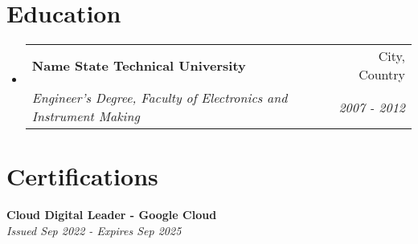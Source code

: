 \documentclass[letterpaper,11pt]{article}
\makeatletter
\newcommand{\resumeItem}[1]{
  \item\small{
    {#1 \vspace{-2pt}}
  }
}
\newcommand{\resumeSubheading}[4]{
  \vspace{-2pt}\item
    \begin{tabular*}{0.97\textwidth}[t]{l@{\extracolsep{\fill}}r}
      \textbf{#1} & #2 \\
      \textit{\small#3} & \textit{\small #4} \\
    \end{tabular*}\vspace{-7pt}
}
\newcommand{\resumeProjectHeading}[2]{
    \item
    \begin{tabular*}{0.97\textwidth}{l@{\extracolsep{\fill}}r}
      \small#1 & #2 \\
    \end{tabular*}\vspace{-7pt}
}
\newcommand{\resumeSubHeadingListStart}{\begin{itemize}[leftmargin=0.15in, label={}]}
\newcommand{\resumeSubHeadingListEnd}{\end{itemize}}
\newcommand{\resumeItemListStart}{\begin{itemize}}
\newcommand{\resumeItemListEnd}{\end{itemize}\vspace{-5pt}}
\makeatother
\begin{document}

\section{Education}
  \resumeSubHeadingListStart
    \resumeSubheading
      {Name State Technical University}{City, Country}
      {Engineer's Degree, Faculty of Electronics and Instrument Making}{2007 - 2012}
  \resumeSubHeadingListEnd

\section{Certifications}
  \begin{itemize}[leftmargin=0.15in, label={}]
    \small{\item{
     \textbf{Cloud Digital Leader - Google Cloud} \\
     \textit{Issued Sep 2022 - Expires Sep 2025} \\
    }}
 \end{itemize}


\end{document}
